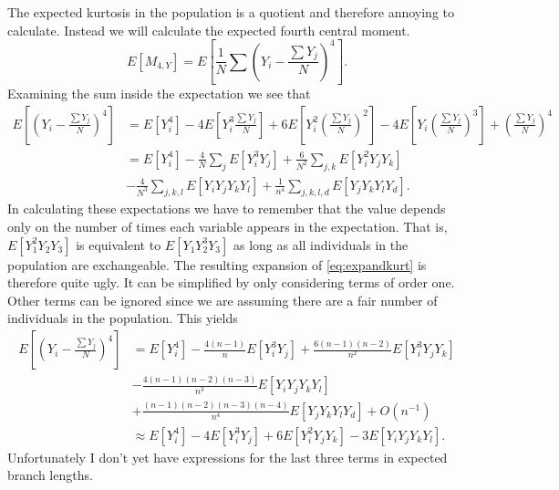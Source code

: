 The expected kurtosis in the population is a quotient and therefore annoying to
calculate. Instead we will calculate the expected fourth central moment. 
\begin{equation}
  E[M_{4,Y}] = E\left[\frac{1}{N} \sum \left( Y_i - \frac{\sum Y_j}{N} \right)^4 \right].
\end{equation}
Examining the sum inside the expectation we see that 
\begin{align}
  \label{eq:expandkurt}
  E\left[ \left( Y_i - \frac{\sum Y_j}{N} \right)^4 \right] &= E[Y_i^4] - 
                                                              4E\left[ Y_i^3 \frac{\sum Y_j}{N} \right] + 
                                                              6E\left[Y_i^2\left(\frac{\sum Y_j}{N}\right)^2\right] - 
                                                              4E\left[Y_i\left(\frac{\sum Y_j}{N}\right)^3\right]+ 
                                                              \left(\frac{\sum Y_j}{N}\right)^4 \nonumber \\
                                                            &= E[Y_i^4] - 
                                                              \frac{4}{N}\sum_j E[Y_i^3Y_j] + 
                                                              \frac{6}{N^2}\sum_{j,k} E[Y_i^2Y_jY_k] \nonumber\\
                                                              &-\frac{4}{N^3}\sum_{j,k,l}E[Y_iY_jY_kY_l] + 
                                                              \frac{1}{n^4}\sum_{j,k,l,d}E[Y_jY_kY_lY_d].
\end{align}
In calculating these expectations we have to remember that the value depends
only on the number of times each variable appears in the expectation. That is,
$E[Y_1^2Y_2Y_3]$ is equivalent to $E[Y_1Y_2^3Y_3]$ as long as all individuals in
the population are exchangeable. The resulting expansion of
\eqref{eq:expandkurt} is therefore quite ugly. It can be simplified by only
considering terms of order one. Other terms can be ignored since we are
assuming there are a fair number of individuals in the population. This yields
\begin{align}
  E\left[ \left( Y_i - \frac{\sum Y_j}{N} \right)^4 \right] &=
  E[Y_i^4]  - \frac{4(n-1)}{n}E[Y_i^3Y_j] + \frac{6(n-1)(n-2)}{n^2}E[Y_i^3Y_jY_k]  \nonumber \\
  &- \frac{4(n-1)(n-2)(n-3)}{n^3}E[Y_iY_jY_kY_l] \nonumber \\
  &+ \frac{(n-1)(n-2)(n-3)(n-4)}{n^4}E[Y_jY_kY_lY_d]
  + O(n^{-1}) \nonumber \\
  &\approx E[Y_i^4]  - 4E[Y_i^3Y_j] + 6E[Y_i^2Y_jY_k] - 3E[Y_iY_jY_kY_l].
\end{align}
Unfortunately I don't yet have expressions for the last three terms in expected
branch lengths.
